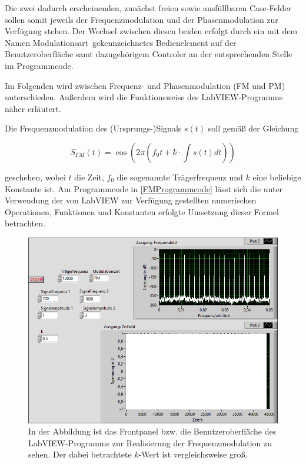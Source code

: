 \documentclass[
a4paper,
12pt,
pagesize,
ngerman
]{scrartcl}
\begin{document}
	\noindent Die zwei dadurch erscheinenden, zunächst freien sowie ausfüllbaren Case-Felder sollen somit jeweils der Frequenzmodulation und der Phasenmodulation zur Verfügung stehen. 
	Der Wechsel zwischen diesen beiden erfolgt durch ein mit dem Namen \glqq Modulationsart\grqq\ gekennzeichnetes Bedienelement auf der Benutzeroberfläche samt dazugehörigem Controler an der entsprechenden Stelle im Programmcode.
	
	Im Folgenden wird zwischen Frequenz- und Phasenmodulation (FM und PM) unterschieden. 
	Außerdem wird die Funktionsweise des LabVIEW-Programms näher erläutert.
	
	Die Frequenzmodulation des (Ursprungs-)Signals $s(t)$ soll gemäß der Gleichung
	
	\begin{equation} \label{FMFormel}
	S_{FM}(t) = \cos (2\pi (f_0 t + k \cdot \int s(t) dt))
	\end{equation}
	
	\noindent geschehen, wobei $t$ die Zeit, $f_0$ die sogenannte Trägerfrequenz und $k$ eine beliebige Konstante ist. 
	Am Programmcode in \cref{FMProgrammcode} lässt sich die unter Verwendung der von LabVIEW zur Verfügung gestellten numerischen Operationen, Funktionen und Konstanten erfolgte Umsetzung dieser Formel betrachten. 
	
	\begin{figure}[H]
		\centering
		\includegraphics[width=1.0\textwidth]{EIRE2018Dateien/Tag4/FMPM-Erzeugung/anderekbei10000Traegerfr/FM-FMPM-Erzeugungp}
		\caption{In der Abbildung ist das Frontpanel bzw. die Benutzeroberfläche des LabVIEW-Programms zur Realisierung der Frequenzmodulation zu sehen. Der dabei betrachtete $k$-Wert ist vergleichsweise groß.}
		\label{FMAusgabegrossesk}
	\end{figure}
	
\end{document}
